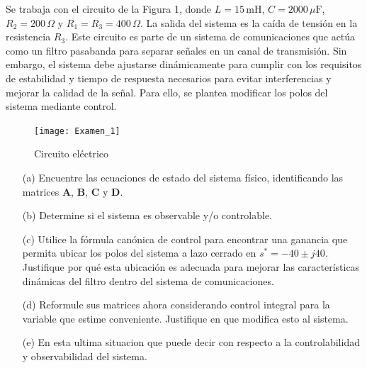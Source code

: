 \documentclass[
  11pt,
  letterpaper,
   addpoints,
   answers
  ]{exam}
\begin{document}
\vspace{0.5cm}
\noindent
\vspace{.85cm}
\begin{questions}
    \question Se trabaja con el circuito de la Figura 1, donde $L = 15\,\text{mH}$, $C = 2000\,\mu\text{F}$, $R_2 = 200\,\Omega$ y $R_1 = R_3 = 400\,\Omega$. La salida del sistema es la caída de tensión en la resistencia $R_3$. Este circuito es parte de un sistema de comunicaciones que actúa como un filtro pasabanda para separar señales en un canal de transmisión. Sin embargo, el sistema debe ajustarse dinámicamente para cumplir con los requisitos de estabilidad y tiempo de respuesta necesarios para evitar interferencias y mejorar la calidad de la señal. Para ello, se plantea modificar los polos del sistema mediante control.

    \begin{figure}[h!]
        \centering
        \texttt{[image: Examen\_1]}
        \caption{Circuito eléctrico}
    \end{figure}
    
    \begin{enumerate}
        \item[(a)] Encuentre las ecuaciones de estado del sistema físico, identificando las matrices $\mathbf{A}$, $\mathbf{B}$, $\mathbf{C}$ y $\mathbf{D}$.
        \item[(b)] Determine si el sistema es observable y/o controlable.
        \item[(c)] Utilice la fórmula canónica de control para encontrar una ganancia que permita ubicar los polos del sistema a lazo cerrado en $s^* = -40 \pm j40$. Justifique por qué esta ubicación es adecuada para mejorar las características dinámicas del filtro dentro del sistema de comunicaciones.
        \item[(d)] Reformule sus matrices ahora considerando control integral para la variable que estime conveniente. Justifique en que modifica esto al sistema.
        \item[(e)] En esta ultima situacion que puede decir con respecto a la controlabilidad y observabilidad del sistema.
    \end{enumerate}
\begin{solution}

\end{solution}
\end{questions}
\end{document}

